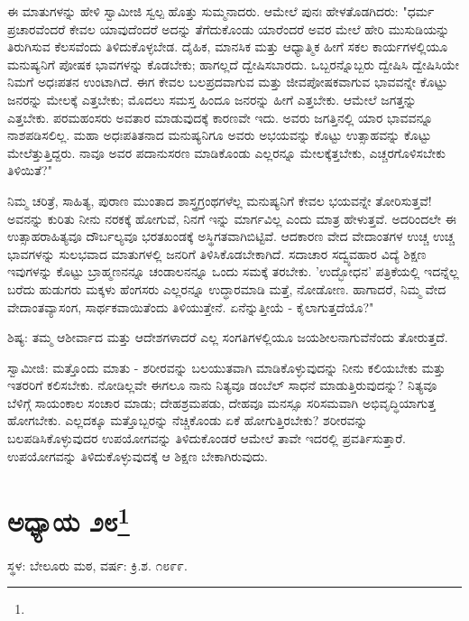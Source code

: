 ಈ ಮಾತುಗಳನ್ನು ಹೇಳಿ ಸ್ವಾಮೀಜಿ ಸ್ವಲ್ಪ ಹೊತ್ತು ಸುಮ್ಮನಾದರು. ಆಮೇಲೆ ಪುನಃ ಹೇಳತೊಡಗಿದರು: "ಧರ್ಮ ಪ್ರಚಾರವೆಂದರೆ ಕೇವಲ ಯಾವುದೆಂದರೆ ಅದನ್ನು ತೆಗೆದುಕೊಂಡು ಯಾರೆಂದರೆ ಅವರ ಮೇಲೆ ಹೇರಿ ಮುಸುಡಿಯನ್ನು ತಿರುಗಿಸುವ ಕೆಲಸವೆಂದು ತಿಳಿದುಕೊಳ್ಳಬೇಡ. ದೈಹಿಕ, ಮಾನಸಿಕ ಮತ್ತು ಆಧ್ಯಾತ್ಮಿಕ ಹೀಗೆ ಸಕಲ ಕಾರ್ಯಗಳಲ್ಲಿಯೂ ಮನುಷ್ಯನಿಗೆ ಪೋಷಕ ಭಾವಗಳನ್ನು ಕೊಡಬೇಕು; ಹಾಗಲ್ಲದೆ ದ್ವೇಷಿಸಬಾರದು. ಒಬ್ಬರನ್ನೊಬ್ಬರು ದ್ವೇಷಿಸಿ ದ್ವೇಷಿಸಿಯೇ ನಿಮಗೆ ಅಧಃಪತನ ಉಂಟಾಗಿದೆ. ಈಗ ಕೇವಲ ಬಲಪ್ರದವಾಗುವ ಮತ್ತು ಜೀವಪೋಷಕವಾಗುವ ಭಾವವನ್ನೇ ಕೊಟ್ಟು ಜನರನ್ನು ಮೇಲಕ್ಕೆ ಎತ್ತಬೇಕು; ಮೊದಲು ಸಮಸ್ತ ಹಿಂದೂ ಜನರನ್ನು ಹೀಗೆ ಎತ್ತಬೇಕು. ಆಮೇಲೆ ಜಗತ್ತನ್ನು ಎತ್ತಬೇಕು. ಪರಮಹಂಸರು ಅವತಾರ ಮಾಡುವುದಕ್ಕೆ ಕಾರಣವೇ ಇದು. ಅವರು ಜಗತ್ತಿನಲ್ಲಿ ಯಾರ ಭಾವವನ್ನೂ ನಾಶಪಡಿಸಲಿಲ್ಲ. ಮಹಾ ಅಧಃಪತಿತನಾದ ಮನುಷ್ಯನಿಗೂ ಅವರು ಅಭಯವನ್ನು ಕೊಟ್ಟು ಉತ್ಸಾಹವನ್ನು ಕೊಟ್ಟು ಮೇಲೆತ್ತುತ್ತಿದ್ದರು. ನಾವೂ ಅವರ ಪದಾನುಸರಣ ಮಾಡಿಕೊಂಡು ಎಲ್ಲರನ್ನೂ ಮೇಲಕ್ಕೆತ್ತಬೇಕು, ಎಚ್ಚರಗೊಳಿಸಬೇಕು ತಿಳಿಯಿತೆ?"

ನಿಮ್ಮ ಚರಿತ್ರೆ, ಸಾಹಿತ್ಯ, ಪುರಾಣ ಮುಂತಾದ ಶಾಸ್ತ್ರಗ್ರಂಥಗಳೆಲ್ಲ ಮನುಷ್ಯನಿಗೆ ಕೇವಲ ಭಯವನ್ನೇ ತೋರಿಸುತ್ತವೆ! ಅವನನ್ನು ಕುರಿತು ನೀನು ನರಕಕ್ಕೆ ಹೋಗುವೆ, ನಿನಗೆ ಇನ್ನು ಮಾರ್ಗವಿಲ್ಲ ಎಂದು ಮಾತ್ರ ಹೇಳುತ್ತವೆ. ಅದರಿಂದಲೇ ಈ ಉತ್ಸಾಹರಾಹಿತ್ಯವೂ ದೌರ್ಬಲ್ಯವೂ ಭರತಖಂಡಕ್ಕೆ ಅಸ್ಥಿಗತವಾಗಿಬಿಟ್ಟಿವೆ. ಆದಕಾರಣ ವೇದ ವೇದಾಂತಗಳ ಉಚ್ಚ ಉಚ್ಚ ಭಾವಗಳನ್ನು ಸುಲಭವಾದ ಮಾತುಗಳಲ್ಲಿ ಜನರಿಗೆ ತಿಳಿಸಿಕೊಡಬೇಕಾಗಿದೆ. ಸದಾಚಾರ ಸದ್ವ್ಯವಹಾರ ವಿದ್ಯೆ ಶಿಕ್ಷಣ ಇವುಗಳನ್ನು ಕೊಟ್ಟು ಬ್ರಾಹ್ಮಣನನ್ನೂ ಚಂಡಾಲನನ್ನೂ ಒಂದು ಸಮಕ್ಕೆ ತರಬೇಕು. 'ಉದ್ಭೋಧನ' ಪತ್ರಿಕೆಯಲ್ಲಿ ಇದನ್ನೆಲ್ಲ ಬರೆದು ಹುಡುಗರು ಮಕ್ಕಳು ಹೆಂಗಸರು ಎಲ್ಲರನ್ನೂ ಉದ್ಧಾರಮಾಡಿ ಮತ್ತೆ, ನೋಡೋಣ. ಹಾಗಾದರೆ, ನಿಮ್ಮ ವೇದ ವೇದಾಂತವ್ಯಾಸಂಗ, ಸಾರ್ಥಕವಾಯಿತೆಂದು ತಿಳಿಯುತ್ತೇನೆ. ಏನೆನ್ನುತ್ತೀಯೆ - ಕೈಲಾಗುತ್ತದೆಯೊ?"

ಶಿಷ್ಯ: ತಮ್ಮ ಆಶೀರ್ವಾದ ಮತ್ತು ಆದೇಶಗಳಾದರೆ ಎಲ್ಲ ಸಂಗತಿಗಳಲ್ಲಿಯೂ ಜಯಶೀಲನಾಗುವೆನೆಂದು ತೋರುತ್ತದೆ.

ಸ್ವಾಮೀಜಿ: ಮತ್ತೊಂದು ಮಾತು - ಶರೀರವನ್ನು ಬಲಯುತವಾಗಿ ಮಾಡಿಕೊಳ್ಳುವುದನ್ನು ನೀನು ಕಲಿಯಬೇಕು ಮತ್ತು ಇತರರಿಗೆ ಕಲಿಸಬೇಕು. ನೋಡಿಲ್ಲವೇ ಈಗಲೂ ನಾನು ನಿತ್ಯವೂ ಡಂಬೆಲ್ ಸಾಧನೆ ಮಾಡುತ್ತಿರುವುದನ್ನು? ನಿತ್ಯವೂ ಬೆಳಿಗ್ಗೆ ಸಾಯಂಕಾಲ ಸಂಚಾರ ಮಾಡು; ದೇಹಶ್ರಮಪಡು, ದೇಹವೂ ಮನಸ್ಸೂ ಸರಿಸಮವಾಗಿ ಅಭಿವೃದ್ಧಿಯಾಗುತ್ತ ಹೋಗಬೇಕು. ಎಲ್ಲದಕ್ಕೂ ಮತ್ತೊಬ್ಬರನ್ನು ನೆಚ್ಚಿಕೊಂಡು ಏಕೆ ಹೋಗುತ್ತಿರಬೇಕು? ಶರೀರವನ್ನು ಬಲಪಡಿಸಿಕೊಳ್ಳುವುದರ ಉಪಯೋಗವನ್ನು ತಿಳಿದುಕೊಂಡರೆ ಆಮೇಲೆ ತಾವೇ ಇದರಲ್ಲಿ ಪ್ರವರ್ತಿಸುತ್ತಾರೆ. ಉಪಯೋಗವನ್ನು ತಿಳಿದುಕೊಳ್ಳುವುದಕ್ಕೆ ಆ ಶಿಕ್ಷಣ ಬೇಕಾಗಿರುವುದು.

\newpage

\chapter[ಅಧ್ಯಾಯ ೨೮]{ಅಧ್ಯಾಯ ೨೮\protect\footnote{}}

\begin{center}
ಸ್ಥಳ: ಬೇಲೂರು ಮಠ, ವರ್ಷ: ಕ್ರಿ.ಶ. ೧೮೯೯.
\end{center}

